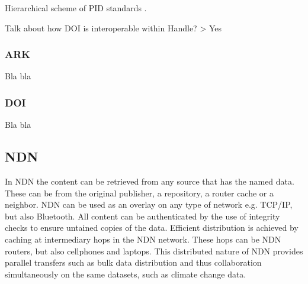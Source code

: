 \begin {table}[H]
\caption {Hierarchical scheme of PID standards \cite{icn-bd}.} \label{tab:pid} 
\begin{center}
\end{center}
\end {table}


Talk about how DOI is interoperable within Handle? > Yes

\subsubsection{ARK}
Bla bla

\subsubsection{DOI}
Bla bla





\subsection{NDN}
\label{overview-ndn}
In NDN the content can be retrieved from any source that has the named data. These can be from the original publisher, a repository, a router cache or a neighbor. NDN can be used as an overlay on any type of network e.g. TCP/IP, but also Bluetooth. All content can be authenticated by the use of integrity checks to ensure untained copies of the data. Efficient distribution is achieved by caching at intermediary hops in the NDN network. These hops can be NDN routers, but also cellphones and laptops. This distributed nature of NDN provides parallel transfers such as bulk data distribution and thus collaboration simultaneously on the same datasets, such as climate change data.

